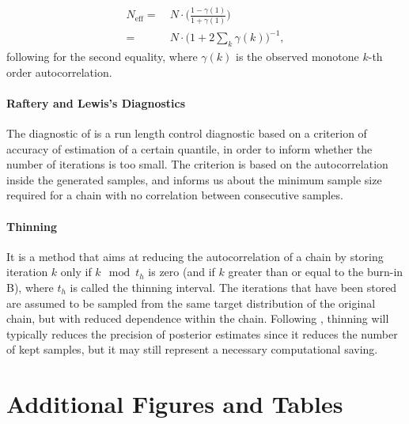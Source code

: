 \begin{equation}\label{eq:neff}
\begin{aligned}
N_{\text{eff}} = & \ N\cdot \bigg( \frac{1-\gamma(1)}{1+\gamma(1)}\bigg) \\
= & \ N\cdot \Big(1+2\sum_k\gamma(k)\Big)^{-1},
\end{aligned}
\end{equation}
following \citet{hartmann_bayesian_2016} for the second equality, where $\gamma(k)$ is the observed monotone $k$-th order autocorrelation.

\paragraph*{Raftery and Lewis’s Diagnostics}
The diagnostic of \citet{raftery1992}  is a run length control diagnostic based on a criterion of accuracy of estimation of a certain quantile, in order to inform whether the number of iterations is too small. The criterion is based on the autocorrelation inside the generated samples, and informs us about the minimum sample size required for a chain with no correlation between consecutive samples.


\paragraph*{Thinning} It is a method that aims at reducing the autocorrelation of a chain by storing iteration $k$ only if $k\mod t_h$ is zero (and if $k$ greater than or equal to the burn-in B), where $t_h$ is called the thinning interval.
The iterations that have been stored are assumed to be sampled from the same target distribution of the original chain, but with reduced dependence within the chain.
Following \citet{bay_thin_2012}, thinning will typically reduces the precision of posterior estimates since it reduces the number of kept samples, but it may still represent a necessary computational saving.



\section{Additional Figures and Tables}\label{app:bayfig}

